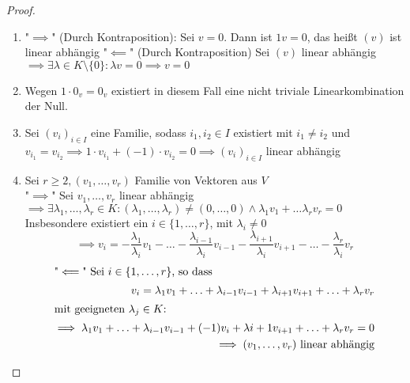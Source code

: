 \documentclass[a4paper]{scrartcl}
\DeclareMathOperator{\Exists}{\exists}
\theoremstyle{definition}
\theoremstyle{plain}
\theoremstyle{plain}
\theoremstyle{remark}
\theoremstyle{remark}
\theoremstyle{remark}
\theoremstyle{remark}
\theoremstyle{remark}
\begin{document}
\begin{proof}
\begin{enumerate}
\item "$\implies$" (Durch Kontraposition): Sei $v = 0$. Dann ist $1 v = 0$, das heißt $(v)$ ist linear abhängig
"$\impliedby$" (Durch Kontraposition) Sei $(v)$ linear abhängig $\implies \Exists \lambda \in K \setminus \{0\}: \lambda v = 0 \implies v = 0$
\item Wegen $1 \cdot 0_v = 0_v$ existiert in diesem Fall eine nicht triviale Linearkombination der Null.
\item Sei $(v_i)_{i\in I}$ eine Familie, sodass $i_1, i_2 \in I$ existiert mit $i_1 \neq i_2$ und $v_{i_1} = v_{i_2} \implies 1 \cdot v_{i_1} + (-1) \cdot v_{i_2} = 0 \implies (v_i)_{i\in I}$ linear abhängig
\item Sei $r\geq 2, (v_1, \ldots, v_r)$ Familie von Vektoren aus $V$ \\
         "$\implies$" Sei $v_1, \ldots, v_r$ linear abhängig $\implies \Exists \lambda_1, \ldots, \lambda_r \in K: (\lambda_1, \ldots, \lambda_r) \neq (0, \ldots, 0) \wedge \lambda_1 v_1 + \ldots \lambda_r v_r = 0$
         Insbesondere existiert ein $i\in \{1, \ldots ,r\}$, mit $\lambda_i \neq 0$
         \[\implies v_i = -\frac{\lambda_1}{\lambda_i} v_1 - \ldots - \frac{\lambda_{i - 1}}{\lambda_i} v_{i - 1} - \frac{\lambda_{i + 1}}{\lambda_i} v_{i + 1} - \ldots - \frac{\lambda_{r}}{\lambda_i} v_{r}\]
\begin{align*}
\intertext{"$\impliedby$" Sei $i\in\{1,\ldots, r\}$, so dass}
v_i = \lambda_1 v_1 + \ldots + \lambda_{i - 1} v_{i - 1} + \lambda_{i + 1} v_{i + 1} + \ldots + \lambda_{r} v_{r} \\
\intertext{mit geeigneten $\lambda_j \in K$:}
\implies \lambda_1 v_1 + \ldots + \lambda_{i - 1} v_{i - 1} + (-1) v_i + \lambda{i + 1} v_{i + 1} + \ldots + \lambda_r v_r = 0 \\
\implies (v_1, \ldots, v_r) ~\text{linear abhängig} \\
\end{align*}
\end{enumerate}
\end{proof}
\end{document}
